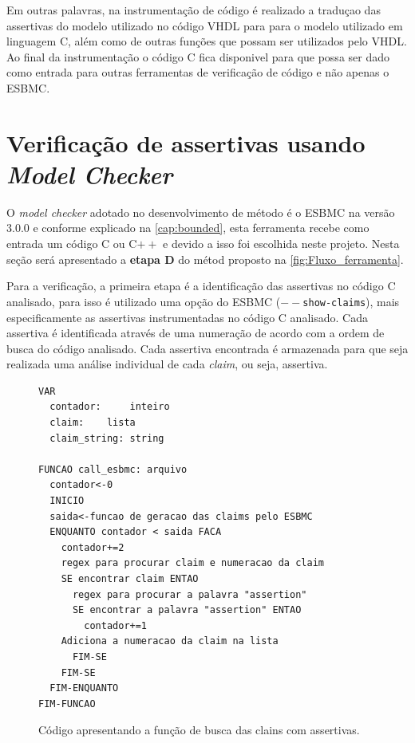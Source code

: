 \par
Em outras palavras, na instrumentação de código é realizado a traduçao das assertivas do modelo utilizado no código VHDL para para o modelo utilizado em linguagem C, além como de outras funções que possam ser utilizados pelo VHDL. Ao final da instrumentação o código C fica disponivel para que possa ser dado como entrada para outras ferramentas de verificação de código e não apenas o ESBMC.

\section{Verificação de assertivas usando \textit{Model Checker}}

\par
O \textit{model checker} adotado no desenvolvimento de método é o ESBMC na versão $3.0.0$ e conforme explicado na \autoref{cap:bounded}, esta ferramenta recebe como entrada um código C ou C$++$ e devido a isso foi escolhida neste projeto. Nesta seção será apresentado a \textbf{etapa D} do métod proposto na \autoref{fig:Fluxo_ferramenta}.

\par
Para a verificação, a primeira etapa é a identificação das assertivas no código C analisado, para isso é utilizado uma opção do ESBMC (\texttt{$--$show-claims}), 
mais especificamente as assertivas instrumentadas no código C analisado. Cada assertiva é identificada através de uma numeração de acordo com a ordem de busca do código analisado. Cada assertiva encontrada é armazenada para que seja realizada uma análise individual de cada \textit{claim}, ou seja,  assertiva.

\begin{figure}[H]
\caption{\label{fig:codigo_claims} Código apresentando a função de busca das clains com assertivas.}
	\begin{center}
    \begin{minipage}{0.99\textwidth}
    \begin{lstlisting}       
VAR
  contador: 	inteiro
  claim: 	lista
  claim_string: string 

FUNCAO call_esbmc: arquivo
  contador<-0
  INICIO
  saida<-funcao de geracao das claims pelo ESBMC
  ENQUANTO contador < saida FACA
    contador+=2
    regex para procurar claim e numeracao da claim
    SE encontrar claim ENTAO
      regex para procurar a palavra "assertion"
      SE encontrar a palavra "assertion" ENTAO
        contador+=1
	Adiciona a numeracao da claim na lista
      FIM-SE
    FIM-SE
  FIM-ENQUANTO
FIM-FUNCAO
    \end{lstlisting}
    \end{minipage}
	\end{center}
\end{figure}

